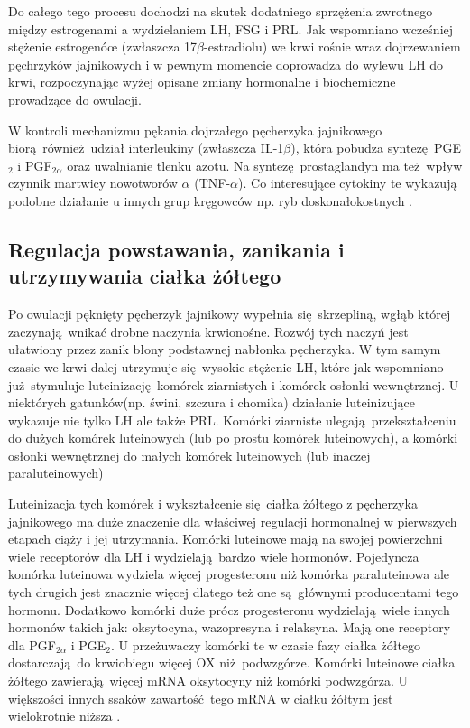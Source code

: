\documentclass[two column, twoside, a4paper]{article}
\begin{document}
Do całego tego procesu dochodzi na skutek dodatniego sprzężenia zwrotnego między estrogenami a wydzielaniem LH, FSG i PRL. Jak wspomniano wcześniej stężenie estrogenóœ (zwłaszcza 17$\beta$-estradiolu) we krwi rośnie wraz dojrzewaniem pęchrzyków jajnikowych i w pewnym momencie doprowadza do wylewu LH do krwi, rozpoczynając wyżej opisane zmiany hormonalne i biochemiczne prowadzące do owulacji.

W kontroli mechanizmu pękania dojrzałego pęcherzyka jajnikowego biorą również udział interleukiny (zwłaszcza IL-1$\beta$), która pobudza syntezę PGE$_{2}$ i PGF$_{2\alpha}$ oraz uwalnianie tlenku azotu. Na syntezę prostaglandyn ma też wpływ czynnik martwicy nowotworów $\alpha$ (TNF-$\alpha$). Co interesujące cytokiny te wykazują podobne działanie u innych grup kręgowców np. ryb doskonałokostnych \autocite{Watanabe1994, Crespo2015, Brannstrom1994, Brannstrom1995}.

\subsection{Regulacja powstawania, zanikania i utrzymywania ciałka żółtego}

Po owulacji pęknięty pęcherzyk jajnikowy wypełnia się skrzepliną, wgłąb której zaczynają wnikać drobne naczynia krwionośne. Rozwój tych naczyń jest ułatwiony przez zanik błony podstawnej nabłonka pęcherzyka. W tym samym czasie we krwi dalej utrzymuje się wysokie stężenie LH, które jak wspomniano już stymuluje luteinizację komórek ziarnistych i komórek osłonki wewnętrznej. U niektórych gatunków(np. świni, szczura i chomika) działanie luteinizujące wykazuje nie tylko LH ale także PRL. Komórki ziarniste ulegają przekształceniu do dużych komórek luteinowych (lub po prostu komórek luteinowych), a komórki osłonki wewnętrznej do małych komórek luteinowych (lub inaczej paraluteinowych) \autocite{Krzymowski2005, Sawicki2017, Greenwald1973}

Luteinizacja tych komórek i wykształcenie się ciałka żółtego z pęcherzyka jajnikowego ma duże znaczenie dla właściwej regulacji hormonalnej w pierwszych etapach ciąży i jej utrzymania. Komórki luteinowe mają na swojej powierzchni wiele receptorów dla LH i wydzielają bardzo wiele hormonów. Pojedyncza komórka luteinowa wydziela więcej progesteronu niż komórka paraluteinowa ale tych drugich jest znacznie więcej dlatego też one są głównymi producentami tego hormonu. Dodatkowo komórki duże prócz progesteronu wydzielają wiele innych hormonów takich jak: oksytocyna, wazopresyna i relaksyna. Mają one receptory dla PGF$_{2\alpha}$ i PGE$_{2}$. U przeżuwaczy komórki te w czasie fazy ciałka żółtego dostarczają do krwiobiegu więcej OX niż podwzgórze. Komórki luteinowe ciałka żółtego zawierają więcej mRNA oksytocyny niż komórki podwzgórza. U większości innych ssaków zawartość tego mRNA w ciałku żółtym jest wielokrotnie niższa \autocite{Krzymowski2005, Jones1988, Ivell1984}.
\end{document}
